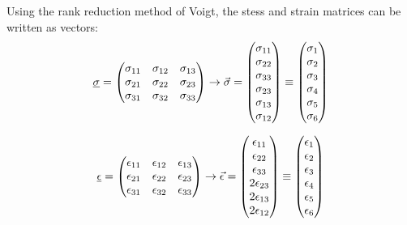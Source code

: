 Using the rank reduction method of Voigt, the stess and strain matrices can be written as vectors:
\begin{equation}
	\uline{\sigma} = 
	\begin{pmatrix}
	\sigma_{11} & \sigma_{12} & \sigma_{13} \\
	\sigma_{21} & \sigma_{22} & \sigma_{23} \\
	\sigma_{31} & \sigma_{32} & \sigma_{33} \\ 
	\end{pmatrix}
	\to 
	\vec{\sigma} = 
	\begin{pmatrix}
	\sigma_{11} \\ \sigma_{22} \\ \sigma_{33} \\ \sigma_{23} \\ \sigma_{13} \\ \sigma_{12}
	\end{pmatrix}
	\equiv
	\begin{pmatrix}
	\sigma_{1} \\ \sigma_{2} \\ \sigma_{3} \\ \sigma_{4} \\ \sigma_{5} \\ \sigma_{6}
	\end{pmatrix}
	\label{eq:sigma_def}
\end{equation}

\begin{equation}
	\uline{\epsilon} = 
	\begin{pmatrix}
	\epsilon_{11} & \epsilon_{12} & \epsilon_{13} \\
	\epsilon_{21} & \epsilon_{22} & \epsilon_{23} \\
	\epsilon_{31} & \epsilon_{32} & \epsilon_{33} \\ 
	\end{pmatrix}
	\to 
	\vec{\epsilon} = 
	\begin{pmatrix}
	\epsilon_{11} \\ \epsilon_{22} \\ \epsilon_{33} \\ 2\epsilon_{23} \\ 2\epsilon_{13} \\ 2\epsilon_{12}
	\end{pmatrix}
	\equiv
	\begin{pmatrix}
	\epsilon_{1} \\ \epsilon_{2} \\ \epsilon_{3} \\ \epsilon_{4} \\ \epsilon_{5} \\ \epsilon_{6}
	\end{pmatrix}
	\label{eq:epsilon_def}
\end{equation}

